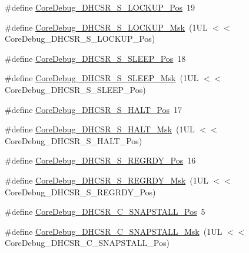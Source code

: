 \begin{DoxyCompactItemize}
\item 
\#define \hyperlink{group___c_m_s_i_s___core_debug_ga2900dd56a988a4ed27ad664d5642807e}{Core\-Debug\-\_\-\-D\-H\-C\-S\-R\-\_\-\-S\-\_\-\-L\-O\-C\-K\-U\-P\-\_\-\-Pos}~19
\item 
\#define \hyperlink{group___c_m_s_i_s___core_debug_ga7b67e4506d7f464ef5dafd6219739756}{Core\-Debug\-\_\-\-D\-H\-C\-S\-R\-\_\-\-S\-\_\-\-L\-O\-C\-K\-U\-P\-\_\-\-Msk}~(1\-U\-L $<$$<$ Core\-Debug\-\_\-\-D\-H\-C\-S\-R\-\_\-\-S\-\_\-\-L\-O\-C\-K\-U\-P\-\_\-\-Pos)
\item 
\#define \hyperlink{group___c_m_s_i_s___core_debug_ga349ccea33accc705595624c2d334fbcb}{Core\-Debug\-\_\-\-D\-H\-C\-S\-R\-\_\-\-S\-\_\-\-S\-L\-E\-E\-P\-\_\-\-Pos}~18
\item 
\#define \hyperlink{group___c_m_s_i_s___core_debug_ga98d51538e645c2c1a422279cd85a0a25}{Core\-Debug\-\_\-\-D\-H\-C\-S\-R\-\_\-\-S\-\_\-\-S\-L\-E\-E\-P\-\_\-\-Msk}~(1\-U\-L $<$$<$ Core\-Debug\-\_\-\-D\-H\-C\-S\-R\-\_\-\-S\-\_\-\-S\-L\-E\-E\-P\-\_\-\-Pos)
\item 
\#define \hyperlink{group___c_m_s_i_s___core_debug_ga760a9a0d7f39951dc3f07d01f1f64772}{Core\-Debug\-\_\-\-D\-H\-C\-S\-R\-\_\-\-S\-\_\-\-H\-A\-L\-T\-\_\-\-Pos}~17
\item 
\#define \hyperlink{group___c_m_s_i_s___core_debug_ga9f881ade3151a73bc5b02b73fe6473ca}{Core\-Debug\-\_\-\-D\-H\-C\-S\-R\-\_\-\-S\-\_\-\-H\-A\-L\-T\-\_\-\-Msk}~(1\-U\-L $<$$<$ Core\-Debug\-\_\-\-D\-H\-C\-S\-R\-\_\-\-S\-\_\-\-H\-A\-L\-T\-\_\-\-Pos)
\item 
\#define \hyperlink{group___c_m_s_i_s___core_debug_ga20a71871ca8768019c51168c70c3f41d}{Core\-Debug\-\_\-\-D\-H\-C\-S\-R\-\_\-\-S\-\_\-\-R\-E\-G\-R\-D\-Y\-\_\-\-Pos}~16
\item 
\#define \hyperlink{group___c_m_s_i_s___core_debug_gac4cd6f3178de48f473d8903e8c847c07}{Core\-Debug\-\_\-\-D\-H\-C\-S\-R\-\_\-\-S\-\_\-\-R\-E\-G\-R\-D\-Y\-\_\-\-Msk}~(1\-U\-L $<$$<$ Core\-Debug\-\_\-\-D\-H\-C\-S\-R\-\_\-\-S\-\_\-\-R\-E\-G\-R\-D\-Y\-\_\-\-Pos)
\item 
\#define \hyperlink{group___c_m_s_i_s___core_debug_ga85747214e2656df6b05ec72e4d22bd6d}{Core\-Debug\-\_\-\-D\-H\-C\-S\-R\-\_\-\-C\-\_\-\-S\-N\-A\-P\-S\-T\-A\-L\-L\-\_\-\-Pos}~5
\item 
\#define \hyperlink{group___c_m_s_i_s___core_debug_ga53aa99b2e39a67622f3b9973e079c2b4}{Core\-Debug\-\_\-\-D\-H\-C\-S\-R\-\_\-\-C\-\_\-\-S\-N\-A\-P\-S\-T\-A\-L\-L\-\_\-\-Msk}~(1\-U\-L $<$$<$ Core\-Debug\-\_\-\-D\-H\-C\-S\-R\-\_\-\-C\-\_\-\-S\-N\-A\-P\-S\-T\-A\-L\-L\-\_\-\-Pos)
$$
\end{DoxyCompactItemize}
